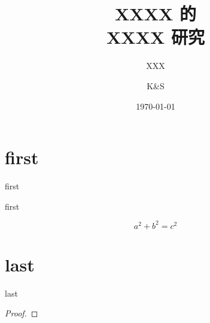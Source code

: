 \documentclass{ctgu-slides}
\title{XXXX 的 \\ XXXX 研究}
\author{XXX \inst{1} 
    \and K{\&}S \inst{2}}
\institute{\inst{1} CTGU 
    \and \inst{2} KST}
\date{\today}
\begin{document}
\frame{\titlepage}

\section{first}

\begin{frame}{first}
    \lipsum[1][2]

    \begin{definition}
        \lipsum[1][1]
    \end{definition}
\end{frame}

\begin{frame}{first}
    \lipsum[1][2]

    \begin{equation}
        a^2 + b^2 = c^2
    \end{equation}

    \lipsum[1][1]
\end{frame}

\section{last}

\begin{frame}{last}
    \lipsum[1][1]

    \begin{proof}
        \lipsum[2][3]
    \end{proof}

    \lipsum[1][1]
\end{frame}
\end{document}
